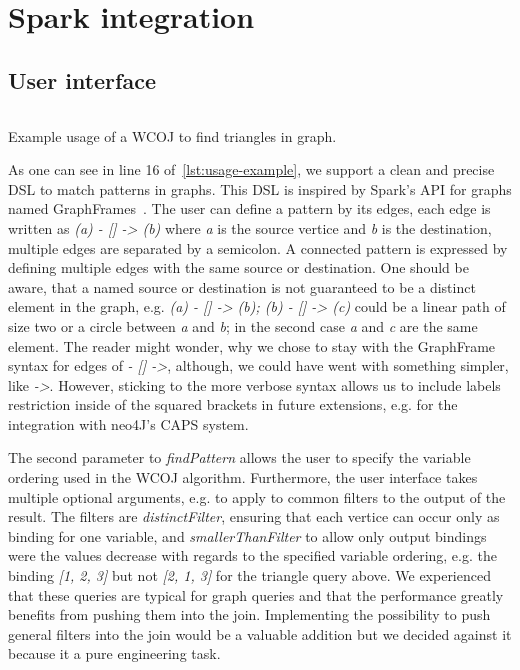 \section{Spark integration}\label{sec:spark-integration}

\subsection{User interface} \label{ssec:user-interface}
\begin{listing}[H]
    \centering
    \inputminted{scala}{code/usage-example.scala}
    \caption{Example usage of a WCOJ to find triangles in graph.}
    \label{lst:usage-example}
\end{listing}

As one can see in line 16 %
of~\cref{lst:usage-example}, we support a clean and precise DSL to match patterns in graphs.
This DSL is inspired by Spark's API for graphs named GraphFrames~\cite{graphframe}.
The user can define a pattern by its edges, each edge is written as \textit{(a) - [] -> (b)} where \textit{a} is the
source vertice and \textit{b} is the destination, multiple edges are separated by a semicolon.
A connected pattern is expressed by defining multiple edges with the same source or destination.
One should be aware, that a named source or destination is not guaranteed to be a distinct element in the graph,
e.g. \textit{(a) - [] -> (b); (b) - [] -> (c)} could be a linear path of size two or a circle between \textit{a} and
\textit{b}; in the second case \textit{a} and \textit{c} are the same element.
The reader might wonder, why we chose to stay with the GraphFrame syntax for edges of
\textit{- [] ->}, although, we could have went with something simpler, like \textit{->}.
However, sticking to the more verbose syntax allows us to include labels restriction inside of the squared brackets
in future extensions, e.g. for the integration with neo4J's \textsc{CAPS} system.

The second parameter to \textit{findPattern} allows the user to specify the variable ordering used in the WCOJ algorithm.
Furthermore, the user interface takes multiple optional arguments, e.g. to apply to common filters to the output of the result.
The filters are \textit{distinctFilter}, ensuring that each vertice can occur only as binding for one variable, and
\textit{smallerThanFilter} to allow only output bindings were the values decrease with regards to the specified variable ordering,
e.g. the binding \textit{[1, 2, 3]} but not \textit{[2, 1, 3]} for the triangle query above.
We experienced that these queries are typical for graph queries and that the performance greatly benefits from pushing
them into the join.
Implementing the possibility to push general filters into the join would be a valuable addition but we decided against it because
it a pure engineering task.

